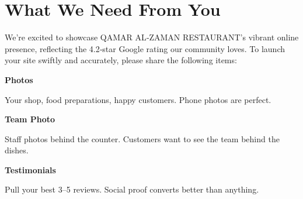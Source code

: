 \documentclass[11pt,letterpaper]{article}
\begin{document}
\vspace{0.2em}

\section*{What We Need From You}

We’re excited to showcase QAMAR AL‑ZAMAN RESTAURANT’s vibrant online presence, reflecting the 4.2‑star Google rating our community loves. To launch your site swiftly and accurately, please share the following items:

\vspace{0.12em}

\noindent\begin{minipage}[t]{0.48\textwidth}
\begin{tcolorbox}[colframe=accent-teal, boxrule=1pt, left=0.7em, right=0.7em, top=0.5em, bottom=0.5em, arc=4pt, boxsep=0pt]
{\bfseries\small\color{accent-teal}Photos}

\vspace{0.15em}

{\small Your shop, food preparations, happy customers. Phone photos are perfect.}
\end{tcolorbox}

\vspace{0.1em}

\begin{tcolorbox}[colframe=accent-teal, boxrule=1pt, left=0.7em, right=0.7em, top=0.5em, bottom=0.5em, arc=4pt, boxsep=0pt]
{\bfseries\small\color{accent-teal}Team Photo}

\vspace{0.15em}

{\small Staff photos behind the counter. Customers want to see the team behind the dishes.}
\end{tcolorbox}

\vspace{0.1em}

\begin{tcolorbox}[colframe=accent-teal, boxrule=1pt, left=0.7em, right=0.7em, top=0.5em, bottom=0.5em, arc=4pt, boxsep=0pt]
{\bfseries\small\color{accent-teal}Testimonials}

\vspace{0.15em}

{\small Pull your best 3--5 reviews. Social proof converts better than anything.}
\end{tcolorbox}
\end{minipage}
\hfill
\end{document}
